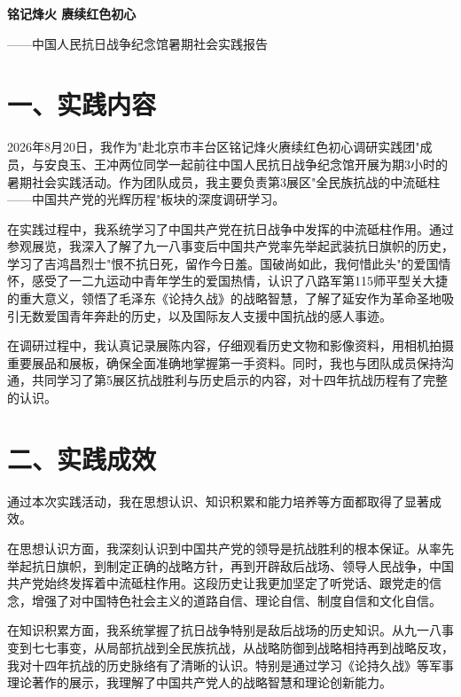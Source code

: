 \documentclass[a4paper,12pt]{article}
\begin{document}
\begin{center}
\songti{}\textbf{铭记烽火 赓续红色初心}
\end{center}
\begin{flushright}
\songti{}——中国人民抗日战争纪念馆暑期社会实践报告
\end{flushright}

\vspace{22pt}

\songti{}
\setlength{\parindent}{2em}
\linespread{1.0}
\selectfont

\section*{\songti{}\textbf{一、实践内容}}

2026年8月20日，我作为"赴北京市丰台区铭记烽火赓续红色初心调研实践团"成员，与安良玉、王冲两位同学一起前往中国人民抗日战争纪念馆开展为期3小时的暑期社会实践活动。作为团队成员，我主要负责第3展区"全民族抗战的中流砥柱——中国共产党的光辉历程"板块的深度调研学习。

在实践过程中，我系统学习了中国共产党在抗日战争中发挥的中流砥柱作用。通过参观展览，我深入了解了九一八事变后中国共产党率先举起武装抗日旗帜的历史，学习了吉鸿昌烈士"恨不抗日死，留作今日羞。国破尚如此，我何惜此头"的爱国情怀，感受了一二九运动中青年学生的爱国热情，认识了八路军第115师平型关大捷的重大意义，领悟了毛泽东《论持久战》的战略智慧，了解了延安作为革命圣地吸引无数爱国青年奔赴的历史，以及国际友人支援中国抗战的感人事迹。

在调研过程中，我认真记录展陈内容，仔细观看历史文物和影像资料，用相机拍摄重要展品和展板，确保全面准确地掌握第一手资料。同时，我也与团队成员保持沟通，共同学习了第5展区抗战胜利与历史启示的内容，对十四年抗战历程有了完整的认识。

\section*{\songti{}\textbf{二、实践成效}}

通过本次实践活动，我在思想认识、知识积累和能力培养等方面都取得了显著成效。

在思想认识方面，我深刻认识到中国共产党的领导是抗战胜利的根本保证。从率先举起抗日旗帜，到制定正确的战略方针，再到开辟敌后战场、领导人民战争，中国共产党始终发挥着中流砥柱作用。这段历史让我更加坚定了听党话、跟党走的信念，增强了对中国特色社会主义的道路自信、理论自信、制度自信和文化自信。

在知识积累方面，我系统掌握了抗日战争特别是敌后战场的历史知识。从九一八事变到七七事变，从局部抗战到全民族抗战，从战略防御到战略相持再到战略反攻，我对十四年抗战的历史脉络有了清晰的认识。特别是通过学习《论持久战》等军事理论著作的展示，我理解了中国共产党人的战略智慧和理论创新能力。
\end{document}
